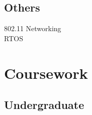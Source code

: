 \documentclass[letterpaper]{deedy-resume} %
\begin{document}
\begin{minipage}[t]{0.33\textwidth}
\subsection{Others}
802.11 \textbullet{} Networking \\
RTOS \\

\sectionspace %





\section{Coursework}

\subsection{Undergraduate}


\end{minipage}
\end{document}
